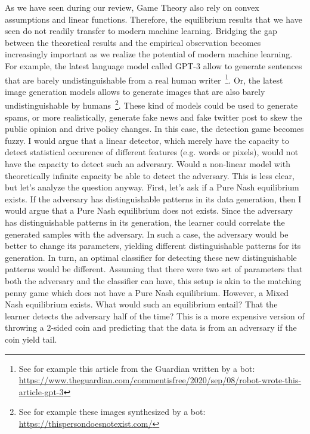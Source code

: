 As we have seen during our review, Game Theory also rely on convex assumptions and linear functions. Therefore, the equilibrium results that we have seen do not readily transfer to modern machine learning.
Bridging the gap between the theoretical results and the empirical observation becomes increasingly important as we realize the potential of modern machine learning. For example,
the latest language model called GPT-3 allow to generate sentences that are barely undistinguishable from a real human writer~\footnote{See for example this article from the Guardian written by a bot: \href{https://www.theguardian.com/commentisfree/2020/sep/08/robot-wrote-this-article-gpt-3}{https://www.theguardian.com/commentisfree/2020/sep/08/robot-wrote-this-article-gpt-3}}. Or, the latest
image generation models allows to generate images that are also barely undistinguishable by humans~\footnote{See for example these images synthesized by a bot: \href{https://thispersondoesnotexist.com/}{https://thispersondoesnotexist.com/}}.
These kind of models could be used to generate spams, or more realistically, generate fake news and fake twitter post to skew the public opinion and drive policy changes.
In this case, the detection game becomes fuzzy. I would argue that a linear detector, which merely have the capacity to detect statistical occurence of different features (e.g. words or pixels),
would not have the capacity to detect such an adversary. Would a non-linear model with theoretically infinite capacity be able to detect the adversary. This is less clear, but let's analyze the question anyway.
First, let's ask if a Pure Nash equilibrium exists. If the adversary has distinguishable patterns in its data generation, then I would argue that a Pure Nash equilibrium does not exists.
Since the adversary has distinguishable patterns in its generation, the learner could correlate the generated samples with the adversary.
In such a case, the adversary would be better to change its parameters, yielding different distinguishable patterns for its generation. In turn,
an optimal classifier for detecting these new distinguishable patterns would be different. Assuming that there were two set of parameters that both
the adversary and the classifier can have, this setup is akin to the matching penny game which does not have a Pure Nash equilibrium.
However, a Mixed Nash equilibrium exists. What would such an equilibrium entail? That the learner detects the adversary
half of the time? This is a more expensive version of throwing a 2-sided coin and predicting that the data is from an adversary if the coin yield tail.

